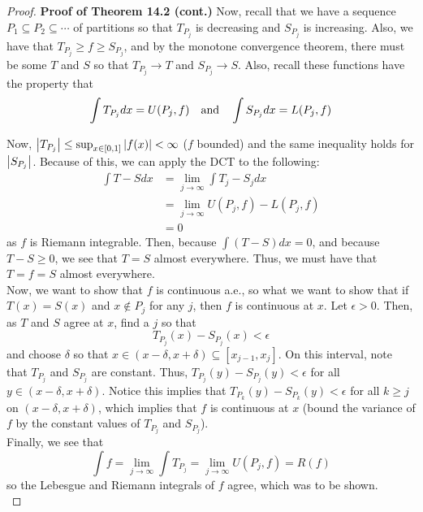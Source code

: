 
\vspace{0.2cm}

\begin{proof}{\textbf{Proof of Theorem 14.2 (cont.)}}
    Now, recall that we have a sequence $P_1 \subseteq P_2 \subseteq \cdots$ of partitions so that $T_{P_j}$ is decreasing and $S_{P_j}$ is increasing. Also, we have that $T_{P_{j}} \geq f \geq S_{P_{j}}$, and by the monotone convergence theorem, there must be some $T$ and $S$ so that $T_{P_{j}} \to T$ and $S_{P_{j}} \to S$. Also, recall these functions have the property that
    \[ \int T_{P_{j}} dx = U(P_j, f) \quad \text{and} \quad \int S_{P_{j}} dx = L(P_{j}, f) \]

    Now, $\left\lvert {T_{P_{j}}} \right\rvert \leq \sup_{x \in [0, 1]}\left\lvert {f(x)} \right\rvert < \infty$ ($f$ bounded) and the same inequality holds for $\left\lvert {S_{P_{j}}} \right\rvert$. Because of this, we can apply the DCT to the following:
    \begin{align*}
        \int T - S dx &= \lim_{j \to \infty} \int T_{j} - S_{j} dx \\
        &= \lim_{j \to \infty} U(P_{j}, f) - L(P_{j}, f)\\
        &= 0
    \end{align*}
    as $f$ is Riemann integrable. Then, because $\int (T - S) dx = 0$, and because $T - S \geq 0$, we see that $T = S$ almost everywhere. Thus, we must have that $T = f = S$ almost everywhere.\\

    Now, we want to show that $f$ is continuous a.e., so what we want to show that if $T(x) = S(x)$ and $x \notin P_{j}$ for any $j$, then $f$ is continuous at $x$. Let $\epsilon > 0$. Then, as $T$ and $S$ agree at $x$, find a $j$ so that
    \[ T_{P_{j}}(x) - S_{P_{j}}(x) < \epsilon \]
    and choose $\delta$ so that $x \in (x - \delta, x + \delta) \subseteq [x_{j - 1}, x_{j}]$. On this interval, note that $T_{P_{j}}$ and $S_{P_{j}}$ are constant. Thus, $T_{P_{j}}(y) - S_{P_{j}}(y) < \epsilon$ for all $y \in (x - \delta, x + \delta)$. Notice this implies that $T_{P_{k}}(y) - S_{P_{k}}(y) < \epsilon$ for all $k \geq j$ on $(x - \delta, x + \delta)$, which implies that $f$ is continuous at $x$ (bound the variance of $f$ by the constant values of $T_{P_{j}}$ and $S_{P_{j}}$).\\

    Finally, we see that
    \[ \int f = \lim_{j \to \infty} \int T_{P_{j}} = \lim_{j \to \infty} U(P_{j}, f) = R(f) \]
    so the Lebesgue and Riemann integrals of $f$ agree, which was to be shown.\\


\end{proof}
